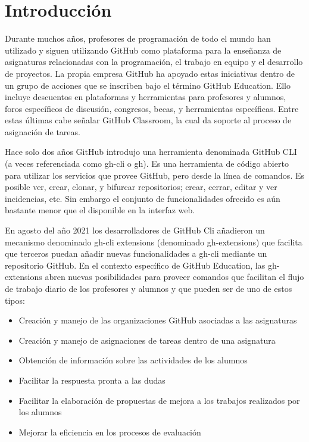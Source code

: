 \section{Introducción}
Durante muchos años, profesores de programación de todo el mundo han utilizado y siguen utilizando GitHub como plataforma para la enseñanza de asignaturas relacionadas con la programación, el trabajo en equipo y el desarrollo de proyectos. La propia empresa GitHub ha apoyado estas iniciativas dentro de un grupo de acciones que se inscriben bajo el término  GitHub Education. Ello incluye descuentos en plataformas y herramientas para profesores y alumnos, foros específicos de discusión, congresos, becas, y herramientas específicas. Entre estas últimas cabe señalar  GitHub Classroom, la cual da soporte al proceso de asignación de tareas.

Hace solo dos años GitHub introdujo una herramienta denominada GitHub CLI (a veces referenciada como gh-cli o gh). Es una herramienta de código abierto para utilizar los servicios que provee GitHub, pero desde la línea de comandos.  Es posible ver, crear, clonar, y bifurcar repositorios; crear, cerrar, editar y ver incidencias, etc. Sin embargo el conjunto de funcionalidades  ofrecido es aún bastante menor que el disponible en la interfaz web.

En agosto del año 2021 los desarrolladores de GitHub Cli añadieron un mecanismo denominado gh-cli extensions (denominado gh-extensions) que facilita que terceros puedan añadir nuevas funcionalidades a gh-cli mediante un repositorio GitHub.
En el contexto específico de GitHub Education, las gh-extensions abren nuevas posibilidades para  proveer comandos que facilitan el flujo de trabajo diario de los profesores y alumnos y que pueden ser de uno de estos tipos:
\begin{itemize}
  \item Creación y manejo de las organizaciones GitHub asociadas a las asignaturas
  \item Creación y manejo de asignaciones de tareas dentro de una asignatura
  \item Obtención de información sobre las actividades de los alumnos
  \item Facilitar la respuesta pronta a las dudas 
  \item Facilitar la elaboración de propuestas de mejora a los trabajos realizados por los alumnos
  \item Mejorar la eficiencia en los procesos de evaluación 
\end{itemize}


